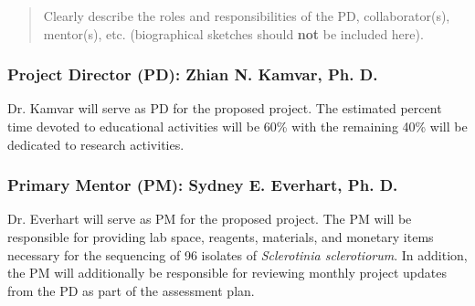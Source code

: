 \documentclass[12pt,letterpaper]{article}
\title{\ruleline{Key Personnel}}
\begin{document}
\maketitle

\begin{quote}
Clearly describe the roles and responsibilities of the PD, collaborator(s), mentor(s), etc.
(biographical sketches should \textbf{not} be included here).
\end{quote}

\subsubsection{Project Director (PD): Zhian N. Kamvar, Ph. D.}

\noindent Dr. Kamvar will serve as PD for the proposed project. The estimated percent time devoted to educational activities will be 60\% with the remaining 40\% will be dedicated to research activities. 

\subsubsection{Primary Mentor (PM): Sydney E. Everhart, Ph. D.}

\noindent Dr. Everhart will serve as PM for the proposed project. 
The PM will be responsible for providing lab space, reagents, materials, and monetary items necessary for the sequencing of 96 isolates of \textit{Sclerotinia sclerotiorum}. 
In addition, the PM will additionally be responsible for reviewing monthly project updates from the PD as part of the assessment plan. 
\end{document}
